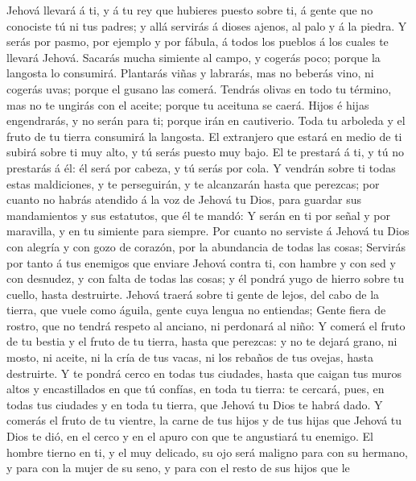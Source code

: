 Jehová llevará á ti, y á tu rey que hubieres puesto sobre ti, á gente
que no conociste tú ni tus padres; y allá servirás á dioses ajenos, al
palo y á la piedra.  Y serás por pasmo, por ejemplo y por
fábula, á todos los pueblos á los cuales te llevará Jehová.
 Sacarás mucha simiente al campo, y cogerás poco; porque
la langosta lo consumirá.  Plantarás viñas y labrarás,
mas no beberás vino, ni cogerás uvas; porque el gusano las comerá.
 Tendrás olivas en todo tu término, mas no te ungirás con
el aceite; porque tu aceituna se caerá.  Hijos é hijas
engendrarás, y no serán para ti; porque irán en cautiverio.
 Toda tu arboleda y el fruto de tu tierra consumirá la
langosta.  El extranjero que estará en medio de ti subirá
sobre ti muy alto, y tú serás puesto muy bajo.  El te
prestará á ti, y tú no prestarás á él: él será por cabeza, y tú serás
por cola.  Y vendrán sobre ti todas estas maldiciones, y
te perseguirán, y te alcanzarán hasta que perezcas; por cuanto no habrás
atendido á la voz de Jehová tu Dios, para guardar sus mandamientos y sus
estatutos, que él te mandó:  Y serán en ti por señal y
por maravilla, y en tu simiente para siempre.  Por cuanto
no serviste á Jehová tu Dios con alegría y con gozo de corazón, por la
abundancia de todas las cosas;  Servirás por tanto á tus
enemigos que enviare Jehová contra ti, con hambre y con sed y con
desnudez, y con falta de todas las cosas; y él pondrá yugo de hierro
sobre tu cuello, hasta destruirte.  Jehová traerá sobre
ti gente de lejos, del cabo de la tierra, que vuele como águila, gente
cuya lengua no entiendas;  Gente fiera de rostro, que no
tendrá respeto al anciano, ni perdonará al niño:  Y
comerá el fruto de tu bestia y el fruto de tu tierra, hasta que
perezcas: y no te dejará grano, ni mosto, ni aceite, ni la cría de tus
vacas, ni los rebaños de tus ovejas, hasta destruirte.  Y
te pondrá cerco en todas tus ciudades, hasta que caigan tus muros altos
y encastillados en que tú confías, en toda tu tierra: te cercará, pues,
en todas tus ciudades y en toda tu tierra, que Jehová tu Dios te habrá
dado.  Y comerás el fruto de tu vientre, la carne de tus
hijos y de tus hijas que Jehová tu Dios te dió, en el cerco y en el
apuro con que te angustiará tu enemigo.  El hombre tierno
en ti, y el muy delicado, su ojo será maligno para con su hermano, y
para con la mujer de su seno, y para con el resto de sus hijos que le
